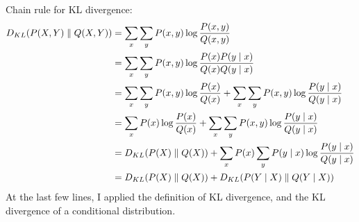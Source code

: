 \begin{answer}
    Chain rule for KL divergence:
    \begin{align*}
        D_{KL}(P(X, Y) \parallel Q(X, Y)) &= \sum_{x} \sum_{y} P(x, y) \log \frac{P(x, y)}{Q(x, y)} \\
        &= \sum_{x} \sum_{y} P(x, y) \log \frac{P(x) P(y \mid x)}{Q(x) Q(y \mid x)} \\
        &= \sum_{x} \sum_{y} P(x, y) \log \frac{P(x)}{Q(x)} + \sum_{x} \sum_{y} P(x, y) \log \frac{P(y \mid x)}{Q(y \mid x)} \\
        &= \sum_{x} P(x) \log \frac{P(x)}{Q(x)} + \sum_{x} \sum_{y} P(x, y) \log \frac{P(y \mid x)}{Q(y \mid x)} \\
        &= D_{KL}(P(X) \parallel Q(X)) + \sum_{x} P(x) \sum_{y} P(y \mid x) \log \frac{P(y \mid x)}{Q(y \mid x)} \\
        &= D_{KL}(P(X) \parallel Q(X)) + D_{KL}(P(Y \mid X) \parallel Q(Y \mid X))
    \end{align*}
    At the last few lines, I applied the definition of KL divergence, and the KL
    divergence of a conditional distribution.
\end{answer}

